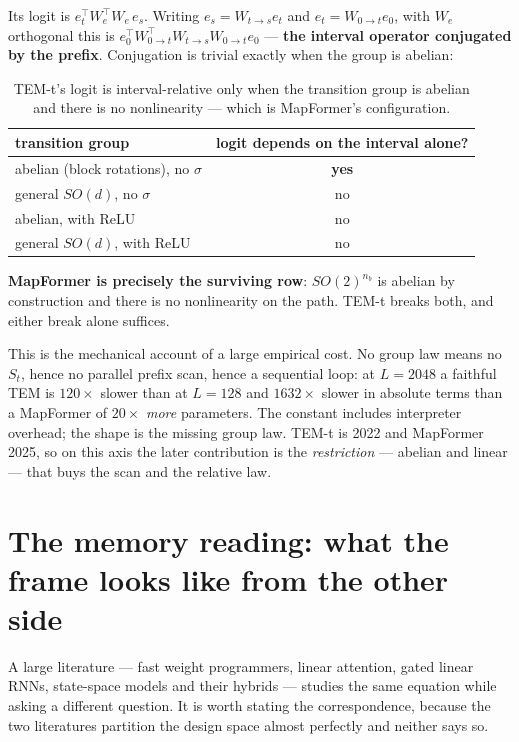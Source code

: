 \documentclass[11pt]{article}
\newcommand{\nb}{n_b}
\begin{document}
Its logit is $e_t^\top W_e^\top W_e\,e_s$. Writing $e_s = W_{t\to s}e_t$ and
$e_t = W_{0\to t}e_0$, with $W_e$ orthogonal this is
$e_0^\top W_{0\to t}^{\top}W_{t\to s}W_{0\to t}e_0$ --- \textbf{the interval operator
conjugated by the prefix}. Conjugation is trivial exactly when the group is abelian:

\begin{table}[htbp]\centering\small
\caption{TEM-t's logit is interval-relative only when the transition group is abelian and there is no nonlinearity --- which is MapFormer's configuration.}
\label{tab:tem}
\begin{tabular}{lc}
\toprule
transition group & logit depends on the interval alone? \\
\midrule
abelian (block rotations), no $\sigma$ & \textbf{yes} \\
general $SO(d)$, no $\sigma$           & no \\
abelian, with ReLU                     & no \\
general $SO(d)$, with ReLU             & no \\
\bottomrule
\end{tabular}
\end{table}

\noindent \textbf{MapFormer is precisely the surviving row}: $SO(2)^{\nb}$ is abelian
by construction and there is no nonlinearity on the path. TEM-t breaks both, and
either break alone suffices.

This is the mechanical account of a large empirical cost. No group law means no
$S_t$, hence no parallel prefix scan, hence a sequential loop: at $L=2048$ a faithful
TEM is $120\times$ slower than at $L=128$ and $1632\times$ slower in absolute terms
than a MapFormer of $20\times$ \emph{more} parameters. The constant includes
interpreter overhead; the shape is the missing group law. TEM-t is 2022 and MapFormer
2025, so on this axis the later contribution is the \emph{restriction} --- abelian and
linear --- that buys the scan and the relative law.


\section{The memory reading: what the frame looks like from the other side}
\label{sec:memory}

A large literature --- fast weight programmers, linear attention, gated linear
RNNs, state-space models and their hybrids --- studies the same equation while
asking a different question. It is worth stating the correspondence, because the
two literatures partition the design space almost perfectly and neither says so.
\end{document}
